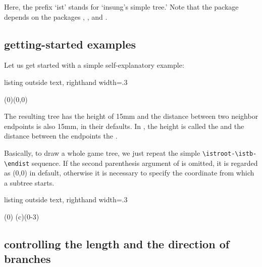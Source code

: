 Here, the prefix `ist' stands for `insung's simple tree.'
Note that the package  depends on the packages , , and .

\subsection{getting-started examples}

Let us get started with a simple self-explanatory example:

\begin{tcblisting}{listing outside text, righthand width=.3\linewidth}
\begin{istgame}
\istroot(0)(0,0) %
  \istb %
  \istb %
  \istb %
\endist %
\end{istgame}
\end{tcblisting}


The resulting tree has the height of 15mm and 
the distance between two neighbor endpoints is also 15mm, in their defaults.
In \Tikz, the height is called the  and 
the distance between the endpoints the .

Basically, to draw a whole game tree, we just repeat the simple \verb|\istroot-\istb-\endist| sequence.
If the second parenthesis argument of \cmd{\istroot} is omitted, it is regarded as (0,0) in default, 
otherwise it is necessary to specify the coordinate from which a subtree starts.

\begin{tcblisting}{listing outside text, righthand width=.3\linewidth}
\begin{istgame}
\istroot(0) %
  \istb %
  \istb %
  \istb %
\endist %
\istroot(c)(0-3) %
  \istb %
  \istb %
\endist
\end{istgame}
\end{tcblisting}


\subsection{controlling the length and the direction of branches}

